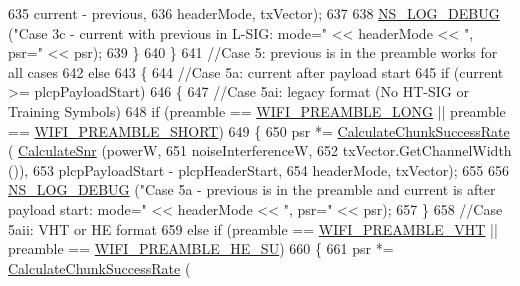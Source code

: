 \begin{DoxyCode}
635                                                 current - previous,
636                                                 headerMode, txVector);
637 
638               \hyperlink{group__logging_ga413f1886406d49f59a6a0a89b77b4d0a}{NS\_LOG\_DEBUG} (\textcolor{stringliteral}{"Case 3c - current with previous in L-SIG: mode="} << headerMode << \textcolor{stringliteral}{
      ", psr="} << psr);
639             \}
640         \}
641       \textcolor{comment}{//Case 5: previous is in the preamble works for all cases}
642       \textcolor{keywordflow}{else}
643         \{
644           \textcolor{comment}{//Case 5a: current after payload start}
645           \textcolor{keywordflow}{if} (current >= plcpPayloadStart)
646             \{
647               \textcolor{comment}{//Case 5ai: legacy format (No HT-SIG or Training Symbols)}
648               \textcolor{keywordflow}{if} (preamble == \hyperlink{group__wifi_gga5e94a56cb338a14ffbbb19c6a41251eba12f3d9468d1630bd38bbef20df1e3eda}{WIFI\_PREAMBLE\_LONG} || preamble == 
      \hyperlink{group__wifi_gga5e94a56cb338a14ffbbb19c6a41251ebab9a39ca1f62d36c33ac489c4cf59745b}{WIFI\_PREAMBLE\_SHORT})
649                 \{
650                   psr *= \hyperlink{classns3_1_1InterferenceHelper_ab1c34c3f7ecef1e37ec778c0cf0e9cef}{CalculateChunkSuccessRate} (
      \hyperlink{classns3_1_1InterferenceHelper_a8f6192d041874595004c007c5a519b4b}{CalculateSnr} (powerW,
651                                                                   noiseInterferenceW,
652                                                                   txVector.GetChannelWidth ()),
653                                                     plcpPayloadStart - plcpHeaderStart,
654                                                     headerMode, txVector);
655 
656                   \hyperlink{group__logging_ga413f1886406d49f59a6a0a89b77b4d0a}{NS\_LOG\_DEBUG} (\textcolor{stringliteral}{"Case 5a - previous is in the preamble and current is after
       payload start: mode="} << headerMode << \textcolor{stringliteral}{", psr="} << psr);
657                 \}
658               \textcolor{comment}{//Case 5aii: VHT or HE format}
659               \textcolor{keywordflow}{else} \textcolor{keywordflow}{if} (preamble == \hyperlink{group__wifi_gga5e94a56cb338a14ffbbb19c6a41251ebab90b0fe0b17f27e51c0fe16239e7b089}{WIFI\_PREAMBLE\_VHT} || preamble == 
      \hyperlink{group__wifi_gga5e94a56cb338a14ffbbb19c6a41251eba99c3e12c6e91fc9a9bee491d20dab807}{WIFI\_PREAMBLE\_HE\_SU})
660                 \{
661                   psr *= \hyperlink{classns3_1_1InterferenceHelper_ab1c34c3f7ecef1e37ec778c0cf0e9cef}{CalculateChunkSuccessRate} (

\end{DoxyCode}
